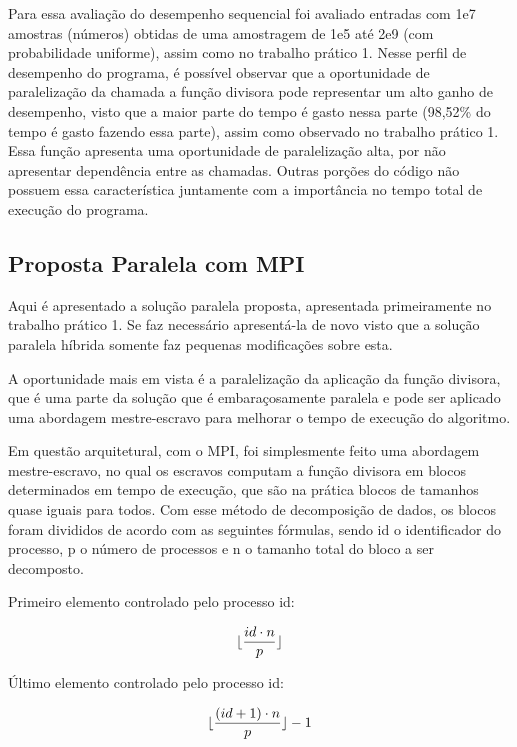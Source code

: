 \documentclass[12pt]{article}
\DeclarePairedDelimiter\floor{\lfloor}{\rfloor}
\begin{document}
Para essa avaliação do desempenho sequencial foi avaliado entradas com 1e7 amostras (números) obtidas de uma amostragem de 1e5 até 2e9 (com probabilidade uniforme), assim como no trabalho prático 1. Nesse perfil de desempenho do programa, é possível observar que a oportunidade de paralelização da chamada a função divisora pode representar um alto ganho de desempenho, visto que a maior parte do tempo é gasto nessa parte (98,52\% do tempo é gasto fazendo essa parte), assim como observado no trabalho prático 1. Essa função apresenta uma oportunidade de paralelização alta, por não apresentar dependência entre as chamadas. Outras porções do código não possuem essa característica juntamente com a importância no tempo total de execução do programa.

\subsection{Proposta Paralela com MPI}

Aqui é apresentado a solução paralela proposta, apresentada primeiramente no trabalho prático 1. Se faz necessário apresentá-la de novo visto que a solução paralela híbrida somente faz pequenas modificações sobre esta.

A oportunidade mais em vista é a paralelização da aplicação da função divisora, que é uma parte da solução que é embaraçosamente paralela e pode ser aplicado uma abordagem mestre-escravo para melhorar o tempo de execução do algoritmo.

Em questão arquitetural, com o MPI, foi simplesmente feito uma abordagem mestre-escravo, no qual os escravos computam a função divisora em blocos determinados em tempo de execução, que são na prática blocos de tamanhos quase iguais para todos. Com esse método de decomposição de dados, os blocos foram divididos de acordo com as seguintes fórmulas, sendo id o identificador do processo, p o número de processos e n o tamanho total do bloco a ser decomposto.

Primeiro elemento controlado pelo processo id:

\begin{equation}
	\floor{\frac{id\cdot n}{p}}
\end{equation}

Último elemento controlado pelo processo id:

\begin{equation}
	\floor{\frac{(id+1)\cdot n}{p}}-1
\end{equation}
\end{document}
